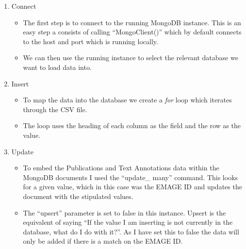 \begin{enumerate}
\item Connect
\begin{itemize}
\item The first step is to connect to the running MongoDB instance. This is an easy step a consists of calling ``MongoClient()'' which by default connects to the host and port which is running locally.
\item We can then use the running instance to select the relevant database we want to load data into.
\end{itemize}
\item Insert
\begin{itemize}
\item To map the data into the database we create a \textit{for} loop which iterates through the CSV file.
\item The loop uses the heading of each column as the field and the row as the value. \\[2em]
\end{itemize}
\item Update
\begin{itemize}
\item To embed the Publications and Text Annotations data within the MongoDB documents I used the ``update\_ many'' command. This looks for a given value, which in this case was the EMAGE ID and updates the document with the stipulated values.
\item The ``upsert'' parameter is set to false in this instance. Upsert is the equivalent of saying ``If the value I am inserting is not currently in the database, what do I do with it?''. As I have set this to false the data will only be added if there is a match on the EMAGE ID.
\end{itemize}
\end{enumerate}
\newpage
\vspace*{\fill}

